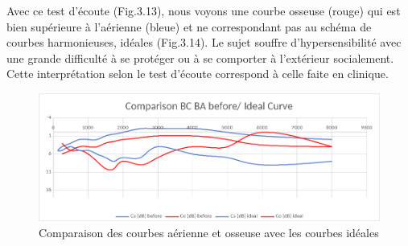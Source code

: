 Avec ce test d'écoute (Fig.3.13), nous voyons une 
courbe osseuse (rouge) qui est bien supérieure à l'aérienne (bleue) et ne correspondant pas au schéma 
de courbes harmonieuses, idéales (Fig.3.14). Le sujet souffre d'hypersensibilité 
avec une 
grande 
difficulté à se protéger ou à se comporter à l'extérieur socialement. Cette interprétation selon le test 
d'écoute   
correspond à 
celle faite en clinique.
	\begin{figure}
	\centering
	\includegraphics[width=1\linewidth]{images/clinique/comparison_bc_ba_before_vs_ideal_curve_meyer.png}
	\caption[Comparaison avec la courbe idéale]{Comparaison des
		courbes aérienne et osseuse  avec les courbes idéales}
	\label{fig:comparisonbcbabeforevsidealcurvemeyer}
\end{figure}


